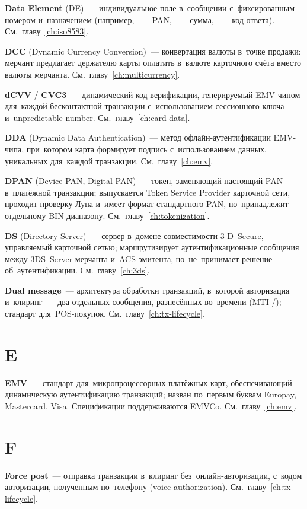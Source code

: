 \textbf{Data Element} (DE)~--- индивидуальное поле в~сообщении
 с~фиксированным номером и~назначением (например,
~--- PAN, ~--- сумма, ~--- код
ответа). См.~главу~\ref{ch:iso8583}.

\textbf{DCC} (Dynamic Currency Conversion)~--- конвертация
валюты в~точке продажи: мерчант предлагает держателю карты
оплатить в~валюте карточного счёта вместо валюты
мерчанта. См.~главу~\ref{ch:multicurrency}.

\textbf{dCVV} / \textbf{CVC3}~--- динамический код верификации,
генерируемый EMV-чипом для~каждой бесконтактной транзакции
с~использованием сессионного ключа и~unpredictable
number. См.~главу~\ref{ch:card-data}.

\textbf{DDA} (Dynamic Data Authentication)~--- метод офлайн-аутентификации
EMV-чипа, при~котором карта формирует подпись с~использованием
данных, уникальных для~каждой
транзакции. См.~главу~\ref{ch:emv}.

\textbf{DPAN} (Device PAN, Digital PAN)~--- токен, заменяющий
настоящий PAN в~платёжной транзакции; выпускается Token Service
Provider карточной сети, проходит проверку Луна и~имеет формат
стандартного PAN, но~принадлежит отдельному
BIN-диапазону. См.~главу~\ref{ch:tokenization}.

\textbf{DS} (Directory Server)~--- сервер в~домене
совместимости 3-D~Secure, управляемый карточной сетью;
маршрутизирует аутентификационные сообщения между 3DS~Server
мерчанта и~ACS эмитента, но~не~принимает решение
об~аутентификации. См.~главу~\ref{ch:3ds}.

\textbf{Dual message}~--- архитектура обработки транзакций,
в~которой авторизация и~клиринг~--- два отдельных сообщения,
разнесённых во~времени (MTI /); стандарт
для~POS-покупок. См.~главу~\ref{ch:tx-lifecycle}.


\section*{E}

\textbf{EMV}~--- стандарт для~микропроцессорных платёжных карт,
обеспечивающий динамическую аутентификацию транзакций; назван
по~первым буквам Europay, Mastercard, Visa.
Спецификации поддерживаются
EMVCo. См.~главу~\ref{ch:emv}.


\section*{F}

\textbf{Force post}~--- отправка транзакции в~клиринг
без~онлайн-авторизации, с~кодом авторизации, полученным
по~телефону (voice
authorization). См.~главу~\ref{ch:tx-lifecycle}.

